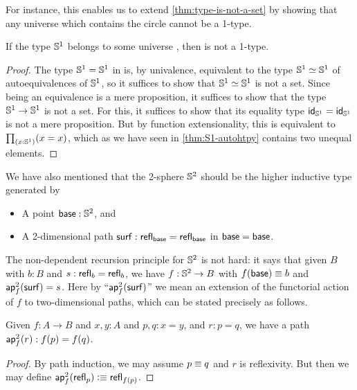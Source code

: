 For instance, this enables us to extend \autoref{thm:type-is-not-a-set} by showing that any universe which contains the circle cannot be a 1-type.

\begin{cor}
  If the type $\Sn^1$ belongs to some universe \type, then \type is not a 1-type.
\end{cor}
\begin{proof}
  The type $\Sn^1=\Sn^1$ in \type is, by univalence, equivalent to the type $\eqv{\Sn^1}{\Sn^1}$ of auto\-equivalences of $\Sn^1$, so it suffices to show that $\eqv{\Sn^1}{\Sn^1}$ is not a set.
  Since being an equivalence is a mere proposition, it suffices to show that the type ${\Sn^1}\to{\Sn^1}$ is not a set.
  For this, it suffices to show that its equality type $\idfunc[\Sn^1] = \idfunc[\Sn^1]$ is not a mere proposition.
  But by function extensionality, this is equivalent to $\prd{x:\Sn^1} (x=x)$, which as we have seen in \autoref{thm:S1-autohtpy} contains two unequal elements.
\end{proof}

%

%
%
We have also mentioned that the 2-sphere $\Sn^2$ should be the higher inductive type generated by
\begin{itemize}
\item A point $\base:\Sn^2$, and
\item A 2-dimensional path $\surf:\refl{\base} = \refl{\base}$ in ${\base=\base}$.
\end{itemize}
%
The non-dependent recursion principle for $\Sn^2$ is not hard: it says that given $B$ with $b:B$ and $s:\refl b = \refl b$, we have $f:\Sn^2\to B$ with $f(\base)\jdeq b$ and $\aptwo f \surf = s$.
Here by ``$\aptwo f \surf$'' we mean an extension of the functorial action of $f$ to two-dimensional paths, which can be stated precisely as follows.

\begin{lem}\label{thm:ap2}
  Given $f:A\to B$ and $x,y:A$ and $p,q:x=y$, and $r:p=q$, we have a path $\aptwo f r : \ap f p = \ap f q$.
\end{lem}
\begin{proof}
  By path induction, we may assume $p\jdeq q$ and $r$ is reflexivity.
  But then we may define $\aptwo f {\refl p} \defeq \refl{\ap f p}$.
\end{proof}

